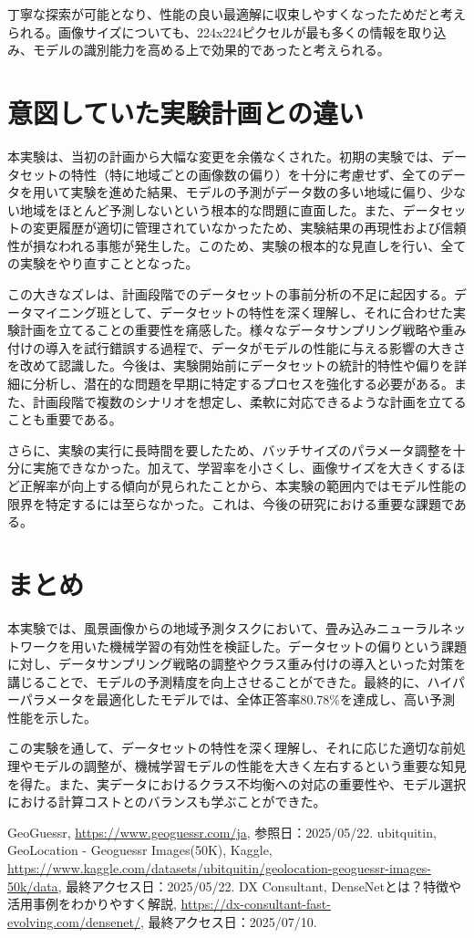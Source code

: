 \documentclass[a4paper, 11pt, titlepage]{jsarticle}
\begin{document}
丁寧な探索が可能となり、性能の良い最適解に収束しやすくなったためだと考えられる。画像サイズについても、224x224ピクセルが最も多くの情報を取り込み、モデルの識別能力を高める上で効果的であったと考えられる。

\section{意図していた実験計画との違い}
本実験は、当初の計画から大幅な変更を余儀なくされた。初期の実験では、データセットの特性（特に地域ごとの画像数の偏り）を十分に考慮せず、全てのデータを用いて実験を進めた結果、モデルの予測がデータ数の多い地域に偏り、少ない地域をほとんど予測しないという根本的な問題に直面した。また、データセットの変更履歴が適切に管理されていなかったため、実験結果の再現性および信頼性が損なわれる事態が発生した。このため、実験の根本的な見直しを行い、全ての実験をやり直すこととなった。

この大きなズレは、計画段階でのデータセットの事前分析の不足に起因する。データマイニング班として、データセットの特性を深く理解し、それに合わせた実験計画を立てることの重要性を痛感した。様々なデータサンプリング戦略や重み付けの導入を試行錯誤する過程で、データがモデルの性能に与える影響の大きさを改めて認識した。今後は、実験開始前にデータセットの統計的特性や偏りを詳細に分析し、潜在的な問題を早期に特定するプロセスを強化する必要がある。また、計画段階で複数のシナリオを想定し、柔軟に対応できるような計画を立てることも重要である。

さらに、実験の実行に長時間を要したため、バッチサイズのパラメータ調整を十分に実施できなかった。加えて、学習率を小さくし、画像サイズを大きくするほど正解率が向上する傾向が見られたことから、本実験の範囲内ではモデル性能の限界を特定するには至らなかった。これは、今後の研究における重要な課題である。

\section{まとめ}
本実験では、風景画像からの地域予測タスクにおいて、畳み込みニューラルネットワークを用いた機械学習の有効性を検証した。データセットの偏りという課題に対し、データサンプリング戦略の調整やクラス重み付けの導入といった対策を講じることで、モデルの予測精度を向上させることができた。最終的に、ハイパーパラメータを最適化したモデルでは、全体正答率80.78\%を達成し、高い予測性能を示した。

この実験を通して、データセットの特性を深く理解し、それに応じた適切な前処理やモデルの調整が、機械学習モデルの性能を大きく左右するという重要な知見を得た。また、実データにおけるクラス不均衡への対応の重要性や、モデル選択における計算コストとのバランスも学ぶことができた。

\begin{thebibliography}{n}
GeoGuessr, \url{https://www.geoguessr.com/ja}, 参照日：2025/05/22.
ubitquitin, GeoLocation - Geoguessr Images(50K), Kaggle, \url{https://www.kaggle.com/datasets/ubitquitin/geolocation-geoguessr-images-50k/data}, 最終アクセス日：2025/05/22.
DX Consultant, DenseNetとは？特徴や活用事例をわかりやすく解説, \url{https://dx-consultant-fast-evolving.com/densenet/}, 最終アクセス日：2025/07/10.
\end{thebibliography}
\end{document}
